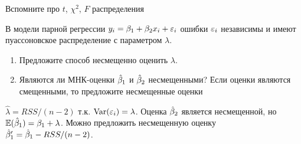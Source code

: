 \documentclass[pdftex,11pt,openany]{book}
\begin{document}
\begin{solution}
Вспомните про $t$, $\chi^2$, $F$ распределения
\end{solution}


\begin{problem}
В модели парной регрессии $y_i=\beta_1+\beta_2 x_i +\varepsilon_i$ ошибки $\varepsilon_i$ независимы и имеют пуассоновское распределение с параметром $\lambda$.
\begin{enumerate}
\item Предложите способ несмещенно оценить $\lambda$.
\item Являются ли МНК-оценки $\hat{\beta}_1$ и $\hat{\beta}_2$ несмещенными? Если оценки являются смещенными, то предложите несмещенные оценки
\end{enumerate}
\end{problem}


\begin{solution}
$\hat{\lambda}=RSS/(n-2)$ т.к. $\operatorname{Var}(\varepsilon_i)=\lambda$. Оценка $\hat{\beta}_2$ является несмещенной, но $\mathbb{E}(\hat{\beta}_1)=\beta_1+\lambda$. Можно предложить несмещенную оценку $\hat{\beta}'_1=\hat{\beta}_1-RSS/(n-2)$.
\end{solution}
\end{document}
